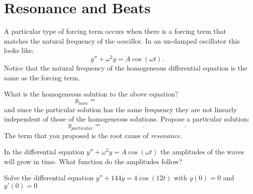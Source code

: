 \newpage\section{Resonance and Beats}
A particular type of forcing term occurs when there is a forcing term that matches the
natural frequency of the ocscillor.  In an un-damped oscillator this looks like:
\[ y'' + \omega^2 y = A \cos\left( \omega t \right). \]
Notice that the natural frequency of the homogeneous differential equation is the same as
the forcing term.  
\begin{problem}
    What is the homogeneous solution to the above equation?
    \[ y_{hom} = \underline{\hspace{2in}} \]
    and since the particular solution has the same frequency they are not linearly
    independent of those of the homogeneous solutions.  Propose a particular solution:
    \[ y_{particular} = \underline{\hspace{2in}}. \]
    The term that you proposed is the root cause of {\it resonance}.
\end{problem}

\begin{problem}
    In the differential equation $y'' + \omega^2 y = A \cos(\omega t)$ the amplitudes of
    the waves will grow in time.  What function do the amplitudes follow?
\end{problem}

\begin{problem}
    Solve the differential equation $y'' + 144y = 4 \cos(12t)$ with $y(0) = 0$ and
    $y'(0)=0$
\end{problem}


